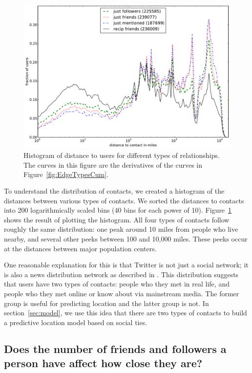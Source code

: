 \begin{figure}[tb]
\centering
\includegraphics[width=\linewidth]{figures/edge_types_norm.pdf}
\caption{
Histogram of distance to users for different types of relationships.
The curves in this figure are the derivatives of the curves in
Figure~\ref{fig:EdgeTypesCum}.
}
\label{fig:EdgeTypes}
\end{figure}

To understand the distribution of contacts, we created a histogram of the distances between various types of contacts.
We sorted the distances to contacts into 200 logarithmically
scaled bins (40 bins for each power of 10).
Figure~\ref{fig:EdgeTypes} shows the result of plotting the histogram.
%
All four types of contacts follow roughly the same
distribution: one peak around 10 miles from people who live nearby, and several
other peeks between 100 and 10,000 miles. These peeks occur at the distances
between major population centers.

One reasonable explanation for this is that Twitter is not just a social
network; it is also a news distribution network as described in
\cite{kwak2010why}.
This distribution suggests that users have two types of contacts: people who
they met in real life, and people who they met online or know about via
mainstream media.
%
The former group is useful for predicting location and the latter group is not.
%
In section~\ref{sec:model}, we use this idea that there are two types of
contacts to build a predictive location model based on social ties.


\subsection{Does the number of friends and followers a person have affect how
close they are?}

